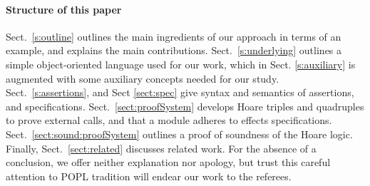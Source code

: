 
 \paragraph{Structure of this paper}
Sect.\ \ref{s:outline}   outlines the main ingredients of our approach in terms of an example, and explains the main contributions.
Sect.\ \ref{s:underlying} outlines a simple object-oriented language used for our work, which in Sect. \ref{s:auxiliary} is augmented with some auxiliary concepts needed for our study.
Sect.\ \ref{s:assertions}, and Sect \ref{sect:spec}  give syntax and semantics of  assertions, and  specifications.
Sect.\ \ref{sect:proofSystem} develops Hoare triples and quadruples to prove external calls, and that a module adheres to \tamed effects specifications.
Sect.\ \ref{sect:sound:proofSystem} outlines a proof of soundness of
the Hoare logic. Finally, Sect.\ \ref{sect:related} discusses related
work. For the absence of a conclusion, we offer neither explanation
nor apology, but trust this careful attention to POPL tradition will
endear our work to the referees.
 
 

